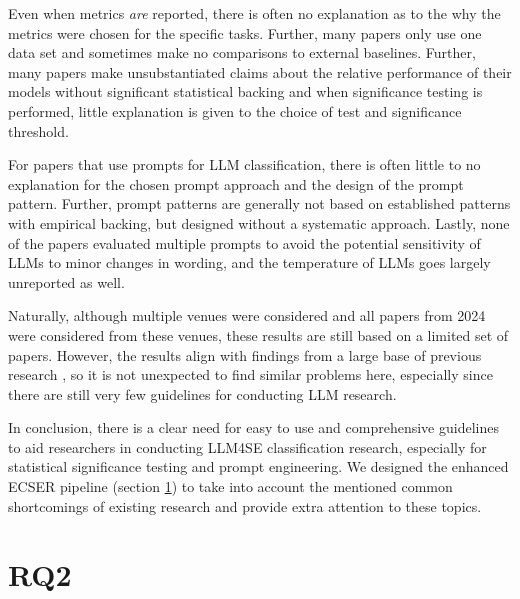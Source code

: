 \documentclass[a4paper]{article}
\begin{document}
Even when metrics \textit{are} reported, there is often no explanation as to the why the metrics were chosen for the specific tasks. Further, many papers only use one data set and sometimes make no comparisons to external baselines. Further, many papers make unsubstantiated claims about the relative performance of their models without significant statistical backing and when significance testing is performed, little explanation is given to the choice of test and significance threshold. 

For papers that use prompts for LLM classification, there is often little to no explanation for the chosen prompt approach and the design of the prompt pattern. Further, prompt patterns are generally not based on established patterns with empirical backing, but designed without a systematic approach. Lastly, none of the papers evaluated multiple prompts to avoid the potential sensitivity of LLMs to minor changes in wording, and the temperature of LLMs goes largely unreported as well. 

Naturally, although multiple venues were considered and all papers from 2024 were considered from these venues, these results are still based on a limited set of papers. However, the results align with findings from a large base of previous research \cite{Dellanna2022,hou2024,guo2023survey,kitchenham2002,Menzies2012}, so it is not unexpected to find similar problems here, especially since there are still very few guidelines for conducting LLM research.

In conclusion, there is a clear need for easy to use and comprehensive guidelines to aid researchers in conducting LLM4SE classification research, especially for statistical significance testing and prompt engineering. We designed the enhanced ECSER pipeline (section \ref{RQ2}) to take into account the mentioned common shortcomings of existing research and provide extra attention to these topics. 

\section{RQ2}
\label{RQ2}

\newpage 
\printbibliography[heading=bibintoc]
\end{document}
